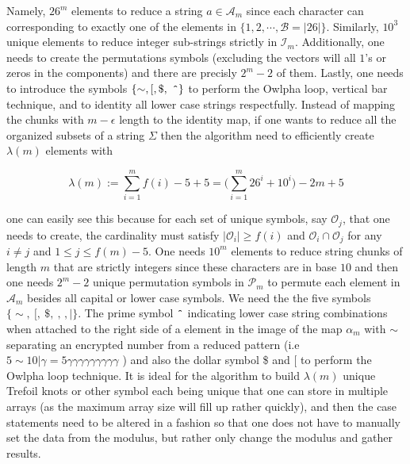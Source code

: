 \documentclass[amsmath,12pt,a4paper]{amsart}
\begin{document}
Namely, $26^m$ elements to reduce a string $a\in \mathcal{A}_m$ since each character can corresponding to exactly one of the elements in $\{1,2,\cdots, \mathcal{B}= |26|\}$. Similarly, $10^3$ unique elements to reduce integer sub-strings strictly in $\mathcal{I}_m$. Additionally, one needs to create the permutations symbols (excluding the vectors will all $1$'s or zeros in the components) and there are precisly $2^m-2$ of them. Lastly, one needs to introduce the symbols $\{ \sim, [, \$ , ~\texttt{\^{}} \}$  to perform the Owlpha loop, vertical bar technique, and to identity all lower case strings respectfully. Instead of mapping the chunks with $m-\epsilon$ length to the identity map, if one wants to reduce all the organized subsets of a string $\Sigma$ then the algorithm need to efficiently create $\lambda(m)$ elements with 

\begin{equation}\label{Eq56}
\lambda(m) := \sum_{i=1}^{m}{f(i)-5}+5 = \biggl(\sum_{i=1}^{m}{26^i+10^i}\biggr)-2m+5
\end{equation}

one can easily see this because for each set of unique symbols, say $\mathcal{O}_j$, that one needs to create, the cardinality must satisfy $|\mathcal{O}_i|\ge f(i) $ and $\mathcal{O}_i\cap \mathcal{O}_j$ for any $i\neq j$ and $1\le j\le f(m)-5$. One needs $10^m$ elements to reduce string chunks of length $m$ that are strictly integers since these characters are in base $10$ and then one needs $2^m-2$ unique permutation symbols in $\mathcal{P}_m$ to permute each element in $\mathcal{A}_m$ besides all capital or lower case symbols. We need the the five symbols $\{ \sim,~ [,~ \$,~ \texttt{\^{},~}, \vert \}$. The prime symbol $\texttt{\^{}}$ indicating lower case string combinations when attached to the right side of a element in the image of the map $\alpha_m$ with $\sim$ separating an encrypted number from a reduced pattern (i.e $5\sim 10\vert \gamma = 5\gamma\gamma\gamma\gamma\gamma\gamma\gamma\gamma\gamma$ ) and also the dollar symbol \$ and $[$ to perform the Owlpha loop technique.  It is ideal for the algorithm to build $\lambda(m)$ unique Trefoil knots or other symbol each being unique that one can store in multiple arrays (as the maximum array size will fill up rather quickly), and then the case statements need to be altered in a fashion so that one does not have to manually set the data from the modulus, but rather only change the modulus and gather results. 
\end{document}
